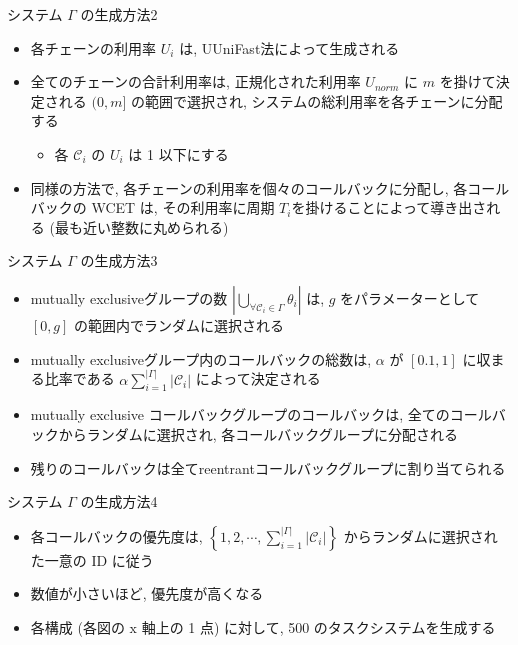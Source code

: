 \begin{frame}{システム $\Gamma$ の生成方法2}
    \begin{itemize}
        \item 各チェーンの利用率 $U_{i}$ は, UUniFast法\cite{emberson2010techniques}によって生成される
        \item 全てのチェーンの合計利用率は, 正規化された利用率 $U_{n o r m}$ に $m$ を掛けて決定される $(0, m]$ の範囲で選択され, システムの総利用率を各チェーンに分配する
              \begin{itemize}
                  \item 各 $\mathcal{C}_{i}$ の $U_{i}$ は 1 以下にする
              \end{itemize}
        \item 同様の方法で, 各チェーンの利用率を個々のコールバックに分配し, 各コールバックの WCET は, その利用率に周期 $T_{i}$を掛けることによって導き出される (最も近い整数に丸められる)
    \end{itemize}
\end{frame}

\begin{frame}{システム $\Gamma$ の生成方法3}
    \begin{itemize}
        \item mutually exclusiveグループの数 $\left|\bigcup_{\forall \mathcal{C}_{i} \in \Gamma} \theta_{i}\right|$ は, $g$ をパラメーターとして $[0, g]$ の範囲内でランダムに選択される
        \item mutually exclusiveグループ内のコールバックの総数は, $\alpha$ が $[0.1,1]$ に収まる比率である $\alpha \sum_{i=1}^{|\Gamma|}\left|\mathcal{C}_{i}\right|$ によって決定される
        \item mutually exclusive コールバックグループのコールバックは, 全てのコールバックからランダムに選択され, 各コールバックグループに分配される
        \item 残りのコールバックは全てreentrantコールバックグループに割り当てられる
    \end{itemize}
\end{frame}

\begin{frame}{システム $\Gamma$ の生成方法4}
    \begin{itemize}
        \item 各コールバックの優先度は, $\left\{1,2, \cdots, \sum_{i=1}^{|\Gamma|}\left|\mathcal{C}_{i}\right|\right\}$ からランダムに選択された一意の ID に従う
        \item 数値が小さいほど, 優先度が高くなる
        \item 各構成 (各図の $\mathrm{x}$ 軸上の 1 点) に対して, 500 のタスクシステムを生成する
    \end{itemize}
\end{frame}

